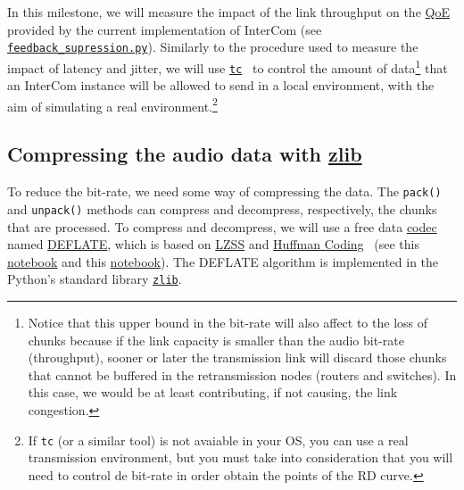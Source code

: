 In this milestone, we will measure the impact of the link throughput
on the \href{https://en.wikipedia.org/wiki/Quality_of_experience}{QoE}
provided by the current implementation of InterCom
(see \href{https://github.com/Tecnologias-multimedia/InterCom/blob/master/src/echo_cancellation.py}{\texttt{feedback\_supression.py}}). Similarly
to the procedure used to measure the impact of latency and jitter, we
will use
\href{https://man7.org/linux/man-pages/man8/tc.8.html}{\texttt{tc}}~\cite{bert2012lartc}
to control the amount of data\footnote{Notice that this upper bound in
  the bit-rate will also affect to the loss of chunks because if the
  link capacity is smaller than the audio bit-rate (throughput),
  sooner or later the transmission link will discard those chunks that
  cannot be buffered in the retransmission nodes (routers and
  switches). In this case, we would be at least contributing, if not
  causing, the link congestion.} that an InterCom instance will be
allowed to send in a local environment, with the aim of simulating a
real environment.\footnote{If \texttt{tc} (or a similar tool) is not
  avaiable in your OS, you can use a real transmission environment,
  but you must take into consideration that you will need to control
  de bit-rate in order obtain the points of the RD curve.}

\subsection{Compressing the audio data with \href{https://zlib.net/}{zlib}}
To reduce the bit-rate, we need some way of compressing the data. The
\verb|pack()| and \verb|unpack()| methods can compress and
decompress, respectively, the chunks that are processed. To compress
and decompress, we will use a free data
\href{https://en.wikipedia.org/wiki/Codec}{codec} named
\href{https://en.wikipedia.org/wiki/DEFLATE}{DEFLATE}, which is based
on
\href{https://en.wikipedia.org/wiki/Lempel%E2%80%93Ziv%E2%80%93Storer%E2%80%93Szymanski}{LZSS}
  and \href{https://en.wikipedia.org/wiki/Huffman_coding}{Huffman
    Coding}~\cite{nelson96datacompression} (see this
  \href{https://github.com/vicente-gonzalez-ruiz/LZ77/blob/master/index.ipynb}{notebook} and
  this
  \href{https://github.com/vicente-gonzalez-ruiz/Huffman_coding/blob/master/index.ipynb}{notebook}). The
  DEFLATE algorithm is implemented in the Python's standard library
  \href{https://docs.python.org/3/library/zlib.html}{\texttt{zlib}}. %

